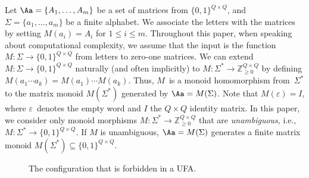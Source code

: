 Let $\Aa = \{A_1, \ldots, A_m\}$ be a set of matrices from $\{0,1\}^{Q \times Q}$, and $\Sigma = \{a_1, \ldots, a_m\}$ be a finite alphabet.
We associate the letters with the matrices by setting $M(a_i) = A_i$ for $1 \le i \le m$.
Throughout this paper, when speaking about computational complexity, we assume that the input is the function $M \colon \Sigma \to \{0,1\}^{Q \times Q}$ from letters to zero-one matrices.
We can extend  $M \colon \Sigma \to \{0,1\}^{Q \times Q}$ naturally (and often implicitly) to $M \colon \Sigma^* \to \mathbb{Z}_{\ge 0}^{Q \times Q}$ by defining $M(a_1 \cdots a_k) = M(a_1) \cdots M(a_k)$. %
Thus, $M$~is a monoid homomorphism from~$\Sigma^*$ to the matrix monoid $M(\Sigma^*)$ generated by $\Aa = M(\Sigma)$.
Note that $M(\varepsilon) = I$, where $\varepsilon$~denotes the empty word and $I$ the $Q \times Q$ identity matrix. In this paper, we consider only monoid morphisms $M \colon \Sigma^* \to \mathbb{Z}_{\ge 0}^{Q \times Q}$ that are \emph{unambiguous}, i.e., $M \colon \Sigma^* \to \{0,1\}^{Q \times Q}$. If $M$ is unambiguous, $\Aa = M(\Sigma)$ generates a finite matrix monoid $M(\Sigma^*) \subseteq \{0,1\}^{Q \times Q}$.

\begin{figure}[h]\centering
{}
\caption{The configuration that is forbidden in a UFA.}\label{fig:diamond-free}
\end{figure}

